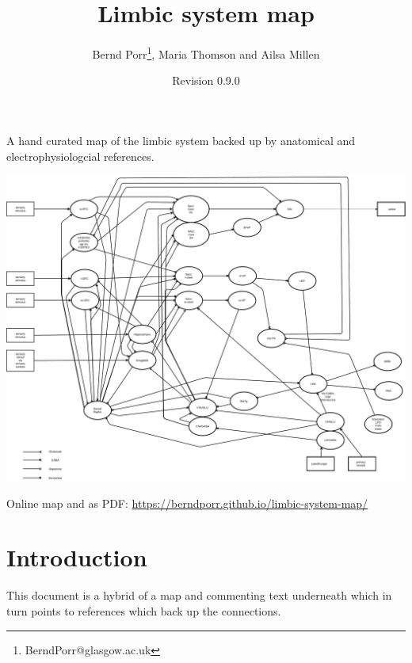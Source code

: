 \documentclass[12pt,a4paper]{article}
\title{Limbic system map}
\author{Bernd Porr\footnote{BerndPorr@glasgow.ac.uk}, Maria Thomson and Ailsa Millen}
\date{Revision 0.9.0}
\begin{document}
\maketitle

\begin{center}
  A hand curated map of the limbic system backed up by anatomical and
  electrophysiologcial references.
\end{center}

\begin{latexonly}
  \begin{center}
    \includegraphics[width=\textwidth]{limbic-map}
  \end{center}
  {\footnotesize Online map and as PDF: \url{https://berndporr.github.io/limbic-system-map/}}
\end{latexonly}


\clearpage

\tableofcontents

\section{Introduction}
This document is a hybrid of a map and commenting text
underneath which in turn points to references which back up the
connections.
\end{document}
